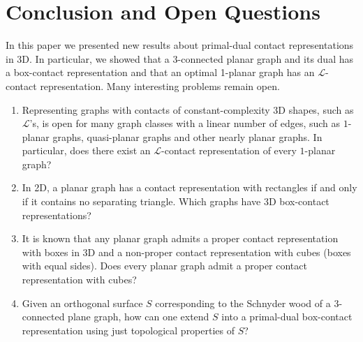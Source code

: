 \documentclass{article}
\newcommand{\LL}{$\mathcal{L}$\xspace}
\newcommand{\LLs}{$\mathcal{L}$'s\xspace}
\newcommand{\ppar}{\ensuremath{(\bot{-}||)}}
\begin{document}
\begin{comment}

\begin{figure}[t]
  \begin{subfigure}[t]{.4\textwidth}
    \centering
    \texttt{[image: cut-box2a]}
    \caption{}
    \label{fig:cut-boxa}
  \end{subfigure}
  \hspace{2em}
  \begin{subfigure}[t]{.4\textwidth}
    \centering
    \texttt{[image: cut-box2b]}
    \caption{}
    \label{fig:cut-boxb}
  \end{subfigure}
    \caption{(a,b) Creating a $\ppar$ open box in a representation of an optimal 1-planar graph.}
\end{figure}

\end{comment}



\section{Conclusion and Open Questions}
In this paper we presented new results about primal-dual contact representations in 3D. In particular, we showed that a 3-connected planar graph and its dual has a box-contact representation and that an optimal 1-planar graph has an \LL-contact representation. Many interesting problems remain open.


\begin{enumerate}
\item Representing graphs with contacts of constant-complexity 3D shapes, such as \LLs, is open for many graph
classes with a linear number of edges, such as $1$-planar graphs, quasi-planar graphs and other nearly planar
graphs. In particular, does there exist an \LL-contact representation of every $1$-planar graph?

\item In 2D, a planar graph has a contact representation with rectangles if and only if it
contains no separating triangle.
Which graphs have 3D box-contact representations?

\item It is known that any planar graph admits a proper contact representation
with boxes in 3D and a non-proper contact representation with cubes (boxes with equal sides).
Does every planar graph admit a proper contact representation with cubes?

\item Given an orthogonal surface $S$ corresponding to the Schnyder wood of a $3$-connected plane graph, how can one extend $S$ into a primal-dual box-contact representation using just topological properties of $S$?
\end{enumerate}
\end{document}
